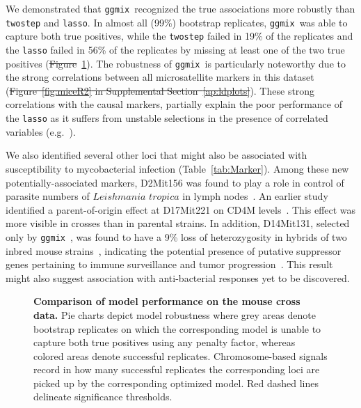 \documentclass[10pt,letterpaper]{article}
\newcommand{\ggmix}{\texttt{ggmix}}
\providecommand{\DIFaddtex}[1]{{\protect\color{blue}\uwave{#1}}} %
\providecommand{\DIFdeltex}[1]{{\protect\color{red}\sout{#1}}}                      %
\providecommand{\DIFaddbegin}{} %
\providecommand{\DIFaddend}{} %
\providecommand{\DIFdelbegin}{} %
\providecommand{\DIFdelend}{} %
\providecommand{\DIFadd}[1]{\texorpdfstring{\DIFaddtex{#1}}{#1}} %
\providecommand{\DIFdel}[1]{\texorpdfstring{\DIFdeltex{#1}}{}} %
\newcommand{\DIFscaledelfig}{0.5}
\newlength{\DIFdelgraphicswidth} %
\newlength{\DIFdelgraphicsheight} %
\newcommand{\DIFaddincludegraphics}[2][]{{\color{blue}\fbox{\DIFOincludegraphics[#1]{#2}}}} %
\newcommand{\DIFdelincludegraphics}[2][]{%
\sbox{\DIFdelgraphicsbox}{\DIFOincludegraphics[#1]{#2}}%
\settoboxwidth{\DIFdelgraphicswidth}{\DIFdelgraphicsbox} %
\settoboxtotalheight{\DIFdelgraphicsheight}{\DIFdelgraphicsbox} %
\scalebox{\DIFscaledelfig}{%
\parbox[b]{\DIFdelgraphicswidth}{\usebox{\DIFdelgraphicsbox}\\[-\baselineskip] \rule{\DIFdelgraphicswidth}{0em}}\llap{\resizebox{\DIFdelgraphicswidth}{\DIFdelgraphicsheight}{%
\setlength{\unitlength}{\DIFdelgraphicswidth}%
\begin{picture}(1,1)%
\thicklines\linethickness{2pt} %
{\color[rgb]{1,0,0}\put(0,0){\framebox(1,1){}}}%
{\color[rgb]{1,0,0}\put(0,0){\line( 1,1){1}}}%
{\color[rgb]{1,0,0}\put(0,1){\line(1,-1){1}}}%
\end{picture}%
}\hspace*{3pt}}} %
} %
\DeclareRobustCommand{\DIFaddbegin}{\DIFOaddbegin \let\includegraphics\DIFaddincludegraphics} %
\DeclareRobustCommand{\DIFaddend}{\DIFOaddend \let\includegraphics\DIFOincludegraphics} %
\DeclareRobustCommand{\DIFdelbegin}{\DIFOdelbegin \let\includegraphics\DIFdelincludegraphics} %
\DeclareRobustCommand{\DIFdelend}{\DIFOaddend \let\includegraphics\DIFOincludegraphics} %
\begin{document}
	We demonstrated that \ggmix ~recognized the true associations more robustly than \texttt{twostep} and \texttt{lasso}. In almost all (99\%) bootstrap replicates, \ggmix ~was able to capture both true positives, while the \texttt{twostep} failed in 19\% of the replicates and the \texttt{lasso} failed in 56\% of the replicates by missing at least one of the two true positives (\DIFdelbegin \DIFdel{Figure}\DIFdelend \DIFaddbegin \DIFadd{Fig}\DIFaddend ~\ref{fig:Mice-comparison-fixTPR}). The robustness of \ggmix ~is particularly noteworthy due to the strong correlations between all microsatellite markers in this dataset (\DIFdelbegin \DIFdel{Figure~\ref{fig:miceR2} in Supplemental Section~\ref{ap:ldplots}}\DIFdelend \DIFaddbegin \DIFadd{see~}\DIFaddend ). These strong correlations with the causal markers, partially explain the poor performance of the \texttt{lasso} as it suffers from unstable selections in the presence of correlated variables (e.g.~\cite{wang2018precision}).

	
	We also identified several other loci that might also be associated with susceptibility to mycobacterial infection (Table~\ref{tab:Marker}). Among these new potentially-associated markers, D2Mit156 was found to play a role in control of parasite numbers of $Leishmania$ $tropica$ in lymph nodes~\cite{sohrabi2013mapping}. An earlier study identified a parent-of-origin effect at D17Mit221 on CD4M levels~\cite{jackson1999multiple}. This effect was more visible in crosses than in parental strains. In addition, D14Mit131, selected only by \ggmix ~, was found to have a 9\% loss of heterozygosity in hybrids of two inbred mouse strains~\cite{c2000allelotype}, indicating the potential presence of putative suppressor genes pertaining to immune surveillance and tumor progression~\cite{lasko1991loss}. This result might also suggest association with anti-bacterial responses yet to be discovered. 



\begin{figure}[!h]
	\caption{{\bf Comparison of model performance on the mouse cross data.}
		Pie charts depict model robustness where grey areas denote bootstrap replicates on which the corresponding model is unable to capture both true positives using any penalty factor, whereas colored areas denote successful replicates. Chromosome-based signals record in how many successful replicates the corresponding loci are picked up by the corresponding optimized model. Red dashed lines delineate significance thresholds.}\label{fig:Mice-comparison-fixTPR}
\end{figure}
\end{document}
